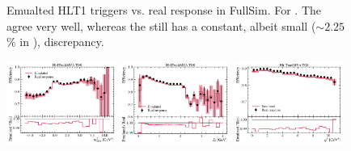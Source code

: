 \begin{figure}[htb]
    \caption{
        Emualted HLT1 triggers vs. real response in FullSim. For \Bp.
        The  agree very well,
        whereas the  still has a constant,
        albeit small ($\sim\!2.25$\% in \qSq), discrepancy.
    }
    \label{fig:hlt1-trackmva-emu}
\end{figure}

\begin{figure}[htb]
    \centering
    \includegraphics[width=0.32\textwidth]{
        ./figs-mc-emulation/emulate-hlt1/b0_Hlt1TrackMVA_TOS_mmiss2.pdf
    }
    \includegraphics[width=0.32\textwidth]{
        ./figs-mc-emulation/emulate-hlt1/b0_Hlt1TrackMVA_TOS_el.pdf
    }
    \includegraphics[width=0.32\textwidth]{
        ./figs-mc-emulation/emulate-hlt1/b0_Hlt1TrackMVA_TOS_q2.pdf
    }


\end{figure}
